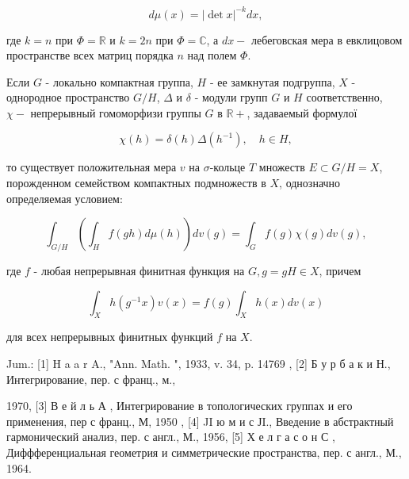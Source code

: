 \documentclass[10pt]{article}
\begin{document}
\[

d \mu(x)=|\operatorname{det} x|^{-k} d x,

\]



где $k=n$ при $\Phi=\mathbb{R}$ и $k=2 n$ при $\Phi=\mathbb{C}$, а $d x-$ лебеговская мера в евклицовом пространстве всех матриц порядка $n$ над полем $\Phi$.



Если $G$ - локально компактная группа, $H$ - ее замкнутая подгруппа, $X$ - однородное пространство $G / H$, $\Delta$ и $\delta$ - модули групп $G$ и $H$ соответственно, $\chi-$ непрерывный гомоморфизи группы $G$ в $\mathbb{R}+$, задаваемый формулої



\[

\chi(h)=\delta(h) \Delta\left(h^{-1}\right), \quad h \in H,

\]



то существует положительная мера $v$ на $\sigma$-кольце $T$ множеств $E \subset G / H=X$, порожденном семейством компактных подмножеств в $X$, однозначно определяемая условием:



\[

\int_{G / H}\left(\int_{H} f(g h) d \mu(h)\right) d v(g)=\int_{G} f(g) \chi(g) d v(g),

\]



где $f$ - любая непрерывная финитная функция на $G, g=g H \in X$, причем



\[

\int_{X} h\left(g^{-1} x\right) v(x)=f(g) \int_{X} h(x) d v(x)

\]



для всех непрерывных финитных функций $f$ на $X$.



Jum.: [1] H a a r A., "Ann. Math. ", 1933, v. 34, p. 14769 , [2] Б у р б а к и Н., Интегрирование, пер. с франц., м.,

1970, [3] В е й л ь А , Интегрирование в топологических группах и его применения, пер с франц., М, 1950 , [4] JI ю м и с ЈI., Введение в абстрактный гармонический анализ, пер. с англ., М., 1956, [5] Х е л г а с о н С , Диффференциальная геометрия и симметрические пространства, пер. с англ., М., 1964.
\end{document}
